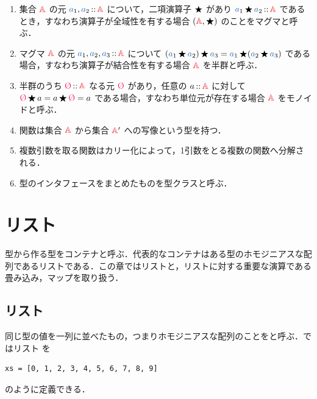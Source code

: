 \documentclass[a5paper,twoside,fleqn,draft]{jsbook}
\begin{document}
\begin{enumerate}
\item 集合 $\hSet{A}$ の元 $\hVar{a}_1,\hVar{a}_2\hIsTypeOf\hSet{A}$ について，二項演算子 $\operatorname{\bigstar}$ があり $\hVar{a}_1\hAnyBinOp \hVar{a}_2\hIsTypeOf\hSet{A}$ であるとき，すなわち演算子が全域性を有する場合 $(\hSet{A},\hAnyBinOp)$ のことをマグマと呼ぶ．
\item マグマ $\hSet{A}$ の元 $\hVar{a}_1,\hVar{a}_2,\hVar{a}_3\hIsTypeOf\hSet{A}$ について $(\hVar{a}_1\hAnyBinOp \hVar{a}_2)\hAnyBinOp \hVar{a}_3=\hVar{a}_1\hAnyBinOp(\hVar{a}_2\hAnyBinOp \hVar{a}_3)$ である場合，すなわち演算子が結合性を有する場合 $\hSet{A}$ を半群と呼ぶ．
\item 半群のうち $\mZero\hIsTypeOf\hSet{A}$ なる元 $\mZero$ があり，任意の $a\hIsTypeOf\hSet{A}$ に対して $\mZero\hAnyBinOp a=a\hAnyBinOp\mZero=a$ である場合，すなわち単位元が存在する場合 $\hSet{A}$ をモノイドと呼ぶ．
\item 関数は集合 $\hSet{A}$ から集合 $\hSet{A}'$ への写像という型を持つ．
\item 複数引数を取る関数はカリー化によって，1引数をとる複数の関数へ分解される．
\item 型のインタフェースをまとめたものを型クラスと呼ぶ．
\end{enumerate}

\chapter{リスト}
\label{ch:list}

\begin{leader}
型から作る型をコンテナと呼ぶ．代表的なコンテナはある型のホモジニアスな配列であるリストである．この章ではリストと，リストに対する重要な演算である畳み込み，マップを取り扱う．
\end{leader}

\section{リスト}

同じ型の値を一列に並べたもの，つまりホモジニアスな配列のことをと呼ぶ．\python ではリスト  を
\begin{pythoncode}
\begin{verbatim}
xs = [0, 1, 2, 3, 4, 5, 6, 7, 8, 9]
\end{verbatim}
\end{pythoncode}
のように定義できる．
\end{document}
